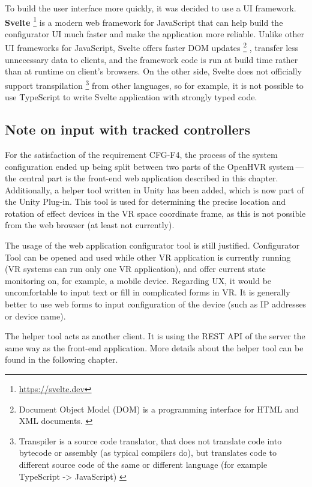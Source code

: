 To build the user interface more quickly, it was decided to use a UI framework.
\textbf{Svelte} \footnote{\href{https://svelte.dev}{https://svelte.dev}} is a modern web framework for JavaScript
that can help build the configurator UI much faster and make the application
more reliable. Unlike other UI frameworks for JavaScript, Svelte offers
faster DOM updates
\footnote{Document Object Model (DOM) is a programming interface for HTML and XML documents. \cite{dom}}
, transfer less unnecessary data to clients, and the framework code is run 
at build time rather than at runtime on client’s browsers. \cite{svelteblog} 
On the other side, Svelte does not officially
support transpilation
\footnote{Transpiler is a source code translator, that does not translate code into bytecode or assembly (as typical compilers do), but translates code to different source code of the same or different language (for example TypeScript -> JavaScript) \cite{sscd}}
from other languages, so for example, it is not possible
to use TypeScript to write Svelte application with strongly typed code.


\hypertarget{x-note-on-input-with-tracked-controllers}{\subsection{Note on input with tracked controllers}}
For the satisfaction of the requirement CFG-F4, the process of the system configuration
ended up being split between two parts of the OpenHVR system — the central part is the front-end web application described
in this chapter. Additionally, a helper tool written in Unity has been added,
which is now part of the Unity Plug-in. This tool is used for determining
the precise location and rotation of effect devices in the VR space
coordinate frame, as this is not possible from the web browser (at least
not currently).


The usage of the web application configurator tool is still justified.
Configurator Tool can be opened and used while other VR application is currently
running (VR systems can run only one VR application), and offer current state
monitoring on, for example, a mobile device. Regarding UX, it would be uncomfortable to
input text or fill in complicated forms in VR. It is generally better to use web forms to
input configuration of the device (such as IP addresses or device name).


The helper tool acts as another client. It is using the REST API of the server
the same way as the front-end application. More details about the helper tool
can be found in the following chapter.


